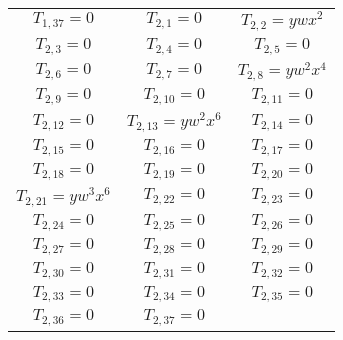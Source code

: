 \documentclass[12pt]{memoireuqam1.3}
\begin{document}
\begin{longtable}{|c|c|c|}
$T_{1,37}= 0$&

$T_{2,1}= 0$&

$T_{2,2}= ywx^2$\\

$T_{2,3}= 0$&

$T_{2,4}= 0$&

$T_{2,5}= 0$\\

$T_{2,6}= 0$&

$T_{2,7}= 0$&

$T_{2,8}= yw^2x^4$\\

$T_{2,9}= 0$&

$T_{2,10}= 0$&

$T_{2,11}= 0$\\

$T_{2,12}= 0$&

$T_{2,13}= yw^2x^6$&

$T_{2,14}= 0$\\

$T_{2,15}= 0$&

$T_{2,16}= 0$&

$T_{2,17}= 0$\\

$T_{2,18}= 0$&

$T_{2,19}= 0$&

$T_{2,20}= 0$\\

$T_{2,21}= yw^3x^6$&

$T_{2,22}= 0$&

$T_{2,23}= 0$\\

$T_{2,24}= 0$&

$T_{2,25}= 0$&

$T_{2,26}= 0$\\

$T_{2,27}= 0$&

$T_{2,28}= 0$&

$T_{2,29}= 0$\\

$T_{2,30}= 0$&

$T_{2,31}= 0$&

$T_{2,32}= 0$\\

$T_{2,33}= 0$&

$T_{2,34}= 0$&

$T_{2,35}= 0$\\

$T_{2,36}= 0$&

$T_{2,37}= 0$&


\end{longtable}
\end{document}
